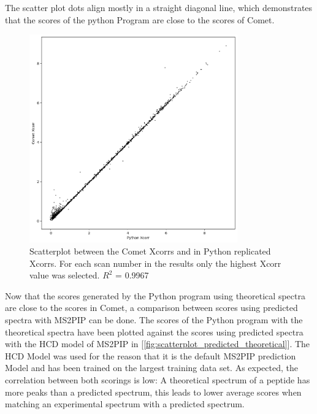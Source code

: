 \documentclass[11pt]{article}
\begin{document}
The scatter plot dots align mostly in a straight diagonal line, which demonstrates that the scores of the python Program are close to the scores of Comet. 
\begin{figure}[ht]
\centering
\includegraphics[width=0.8\textwidth]{figs/scatterplot.png}
\caption{Scatterplot between the Comet Xcorrs and in Python replicated Xcorrs. For each scan number in the results only the highest Xcorr value was selected. \(R^2\) = 0.9967}
\label{fig:scatterplot}
\end{figure}

Now that the scores generated by the Python program using theoretical spectra are close to the scores in Comet, a comparison between scores using predicted spectra with MS2PIP can be done. The scores of the Python program with the theoretical spectra have been plotted against the scores using predicted spectra with the HCD model of MS2PIP in [\cref{fig:scatterplot_predicted_theoretical}]. The HCD Model was used for the reason that it is the default MS2PIP prediction Model and has been trained on the largest training data set. As expected, the correlation between both scorings is low: A theoretical spectrum of a peptide has more peaks than a predicted spectrum, this leads to lower average scores when matching an experimental spectrum with a predicted spectrum.
\end{document}
